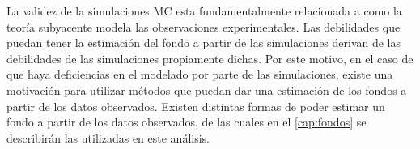 






La validez de la simulaciones MC esta fundamentalmente relacionada a como la
teoría subyacente modela las observaciones experimentales. Las debilidades que
puedan tener la estimación del fondo a partir de las simulaciones derivan de las
debilidades de las simulaciones propiamente dichas. Por este motivo, en el caso
de que haya deficiencias en el modelado por parte de las simulaciones, existe
una motivación para utilizar métodos que puedan dar una estimación de los fondos
a partir de los datos observados. Existen distintas formas de poder estimar un
fondo a partir de los datos observados, de las cuales en el \cref{cap:fondos} se
describirán las utilizadas en este análisis.

